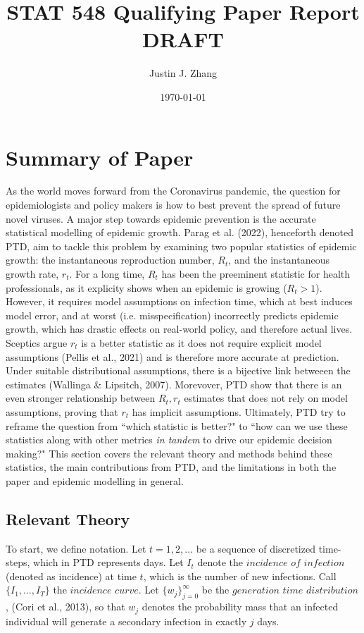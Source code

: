 \documentclass[12pt]{article}
\title{STAT 548 Qualifying Paper Report DRAFT} %
\author{Justin J. Zhang} %
\date{\today} %
\begin{document}
\maketitle

  \section{Summary of Paper}
    As the world moves forward from the Coronavirus pandemic, the question for epidemiologists and policy makers is how to 
    best prevent the spread of future novel viruses. A major step towards epidemic prevention is the accurate statistical 
    modelling of epidemic growth. Parag et al. (2022), henceforth denoted PTD, aim to tackle this problem by examining 
    two popular statistics of epidemic growth: the instantaneous reproduction number, $R_t$, 
    and the instantaneous growth rate, $r_t$. For a long time, $R_t$ has been the preeminent statistic for health professionals,
    as it explicity shows when an epidemic is growing ($R_t > 1$). However, it requires model assumptions on infection time, which
    at best induces model error, and at worst (i.e. misspecification) incorrectly predicts epidemic growth, which has drastic effects
    on real-world policy, and therefore actual lives. Sceptics argue $r_t$ is a better statistic as it does not require explicit
    model assumptions (Pellis et al., 2021) and is therefore more accurate at prediction. Under suitable distributional assumptions, 
    there is a bijective link betweeen the estimates (Wallinga \& Lipsitch, 2007). Morevover, PTD show that there is an even stronger relationship 
    between $R_t, r_t$ estimates that does not rely on model assumptions, proving that $r_t$ has implicit assumptions. 
    Ultimately, PTD try to reframe the question from ``which statistic is better?" to ``how can we use these statistics
    along with other metrics \textit{in tandem} to drive our epidemic decision making?" 
    This section covers the relevant theory and methods behind these statistics, the main contributions from PTD, 
    and the limitations in both the paper and epidemic modelling in general.

    \subsection{Relevant Theory}
      To start, we define notation. Let $t= 1,2,\dots$ be a sequence of discretized time-steps, which in PTD
      represents days. Let $I_t$ denote the $\textit{incidence of infection}$ (denoted as incidence) at time $t$, which is the number of new infections.
      Call $\{I_1,\dots,I_T\}$ the $\textit {incidence curve}$. 
      Let $\{w_j\}_{j=0}^\infty$ be the $\textit{generation time distribution}$, (Cori et al., 2013), so that $w_j$ denotes 
      the probability mass that an infected individual will generate a secondary infection in exactly $j$ days. \\
    
\end{document}
